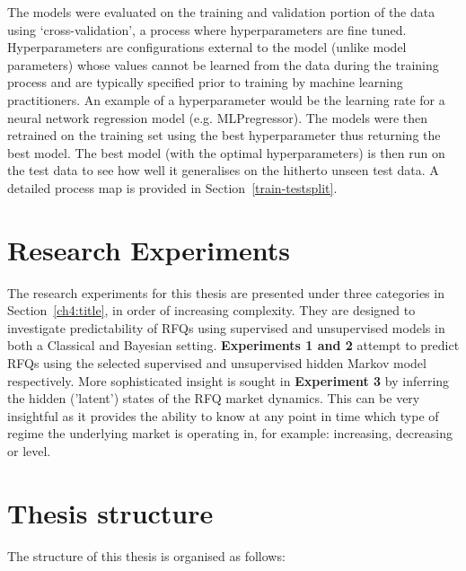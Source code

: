 The models were evaluated on the training and validation portion of the data using `cross-validation', a process where hyperparameters are fine tuned. Hyperparameters are configurations external to the model (unlike model parameters) whose values cannot be learned from the data during the training process and are typically specified prior to training by machine learning practitioners. An example of a hyperparameter would be the learning rate for a neural network regression model (e.g. MLPregressor). The models were then retrained on the training set using the best hyperparameter thus returning the best model. The best model (with the optimal hyperparameters) is then run on the test data to see how well it generalises on the hitherto unseen test data. A detailed process map is provided in Section~\ref{train-testsplit}.


\section{Research Experiments}\label{Ch1Sec5}

The research experiments for this thesis are presented under three categories in Section~\ref{ch4:title}, in order of increasing complexity. They are designed to investigate predictability of RFQs using supervised and unsupervised models in both a Classical and Bayesian setting. \textbf{Experiments 1 and 2} attempt to predict RFQs using the selected supervised and unsupervised hidden Markov model respectively. More sophisticated insight is sought in \textbf{Experiment 3} by inferring the hidden ('latent') states of the RFQ market dynamics. This can be very insightful as it provides the ability to know at any point in time which type of regime the underlying market is operating in, for example: increasing, decreasing or level. 


\section{Thesis structure}\label{Ch1Sec5}

The structure of this thesis is organised as follows:

